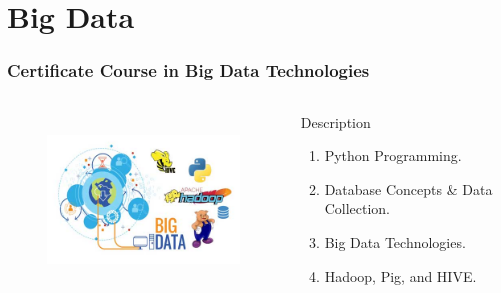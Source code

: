 \section{Big Data}
\begin{frame}
	\frametitle{Certificate Course in Big Data Technologies}
	\begin{columns}
	
	
	\begin{figure}
		\includegraphics[width=180pt,height=130pt]{figures/course_bdt.jpg}
	\end{figure}
	
	
	\begin{block}{Description}
		
		\begin{enumerate}
			\item Python Programming. 
			\item Database Concepts \& Data Collection.
			\item Big Data Technologies.
			\item Hadoop, Pig, and HIVE.
		\end{enumerate}
		
	\end{block}
	
\end{columns}
\end{frame}

